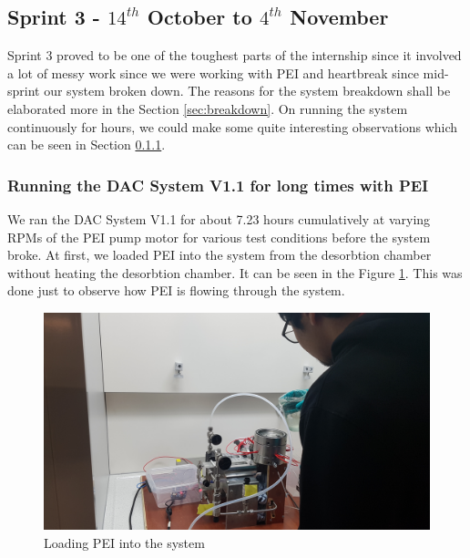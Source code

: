 \subsection{Sprint 3 - $14^{th}$ October to $4^{th}$ November}

Sprint 3 proved to be one of the toughest parts of the internship since it involved a lot of messy work since we were working with PEI and heartbreak since mid-sprint our system broken down. The reasons for the system breakdown shall be elaborated more in the Section \ref{sec:breakdown}. On running the system continuously for hours, we could make some quite interesting observations which can be seen in Section \ref{sec:obs}.  

\subsubsection{Running the DAC System V1.1 for long times with PEI}
\label{sec:obs}

We ran the DAC System V1.1 for about 7.23 hours cumulatively at varying RPMs of the PEI pump motor for various test conditions before the system broke. At first, we loaded PEI into the system from the desorbtion chamber without heating the desorbtion chamber. It can be seen in the Figure \ref{fig:peiloading}. This was done just to observe how PEI is flowing through the system. 

\begin{figure}[H]
    \centering
    \includegraphics[scale = 0.1]{images/mywork/Sprint3/peiloading1.jpg}
    \caption{Loading PEI into the system}
    \label{fig:peiloading}
\end{figure}

